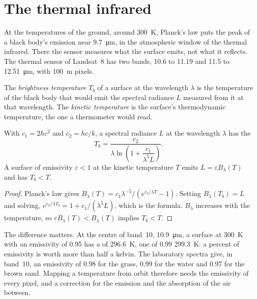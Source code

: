 \section{The thermal infrared}\label{sec:b3:remote-sensing-gis:thermal}

At the temperatures of the ground, around \qty{300}{K}, Planck's law puts
the peak of a black body's emission near \qty{9.7}{\micro\metre}, in the
atmospheric window of the thermal infrared. There the sensor measures what
the surface emits, not what it reflects. The thermal sensor of Landsat~8
has two bands, 10.6 to 11.19 and 11.5 to \qty{12.51}{\micro\metre}, with
\qty{100}{m} pixels.

\begin{definition}\label{def:b3:remote-sensing-gis:brightness}
The \emph{brightness temperature} $T_b$ of a
surface at the wavelength $\lambda$ is the temperature of the black body
that would emit the spectral radiance $L$ measured from it at that
wavelength. The \emph{kinetic temperature} is the surface's thermodynamic
temperature, the one a thermometer would read.
\end{definition}

\begin{proposition}\label{prop:b3:remote-sensing-gis:planck-inversion}
With $c_1 = 2hc^2$ and $c_2 = hc/k$, a spectral radiance $L$ at the
wavelength $\lambda$ has the 
\[
T_b = \frac{c_2}{\lambda \ln\!\left(1 + \dfrac{c_1}{\lambda^5 L}\right)} .
\]
A surface of emissivity $\varepsilon < 1$ at the kinetic temperature $T$
emits $L = \varepsilon B_\lambda(T)$ and has $T_b < T$.
\end{proposition}

\begin{proof}
Planck's law gives $B_\lambda(T) = c_1\lambda^{-5}/(e^{c_2/\lambda T} -
1)$. Setting $B_\lambda(T_b) = L$ and solving, $e^{c_2/\lambda T_b} = 1 +
c_1/(\lambda^5L)$, which is the formula. $B_\lambda$ increases with the
temperature, so $\varepsilon B_\lambda(T) < B_\lambda(T)$ implies $T_b < T$.
\end{proof}

The difference matters. At the centre of band~10, \qty{10.9}{\micro\metre},
a surface at \qty{300}{K} with an emissivity of 0.95 has a  of \qty{296.6}{K}, one of 0.99 \qty{299.3}{K}: a percent of
emissivity is worth more than half a kelvin. The laboratory spectra give,
in band~10, an emissivity of 0.98 for the grass, 0.99 for the water and
0.97 for the brown sand. Mapping a temperature from orbit therefore needs
the emissivity of every pixel, and a correction for the emission and the
absorption of the air between.


